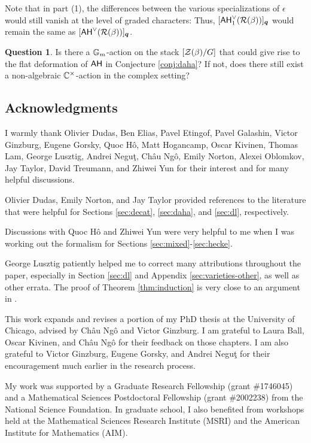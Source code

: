 \documentclass[a4paper,10pt,leqno]{amsart}
\theoremstyle{plain}
\theoremstyle{plain}
\theoremstyle{plain}
\theoremstyle{definition}
\newtheorem{quest}[mainthm]{Question}
\theoremstyle{remark}
\newcommand{\Q}{\bm{q}}
\begin{document}
Note that in part (1), the differences between the various specializations of $\epsilon$ would still vanish at the level of graded characters: 
Thus, $[\sf{AH}_1^\vee(\cal{R}(\beta))]_{\Q}$ would remain the same as $[\sf{AH}^\vee(\cal{R}(\beta))]_{\Q}$.

\begin{quest}
Is there a $\bb{G}_m$-action on the stack $[\cal{Z}(\beta)/G]$ that could give rise to the flat deformation of $\sf{AH}$ in Conjecture \ref{conj:daha}?
If not, does there still exist a non-algebraic $\bb{C}^\times$-action in the complex setting?
\end{quest}

\subsection{Acknowledgments}

I warmly thank Olivier Dudas, Ben Elias, Pavel Etingof, Pavel Galashin, Victor Ginzburg, Eugene Gorsky, Quoc H\^{o}, Matt Hogancamp, Oscar Kivinen, Thomas Lam, George Lusztig, Andrei Negu\c{t}, Ch\^{a}u Ng\^{o}, Emily Norton, Alexei Oblomkov, Jay Taylor, David Treumann, and Zhiwei Yun for their interest and for many helpful discussions.

Olivier Dudas, Emily Norton, and Jay Taylor provided references to the literature that were helpful for Sections \ref{sec:decat}, \ref{sec:daha}, and \ref{sec:dl}, respectively. 

Discussions with Quoc H\^{o} and Zhiwei Yun were very helpful to me when I was working out the formalism for Sections \ref{sec:mixed}-\ref{sec:hecke}.

George Lusztig patiently helped me to correct many attributions throughout the paper, especially in Section \ref{sec:dl} and Appendix \ref{sec:varieties-other}, as well as other errata.
The proof of Theorem \ref{thm:induction} is very close to an argument in \cite{ly_2019}.

This work expands and revises a portion of my PhD thesis at the University of Chicago, advised by Ch\^{a}u Ng\^{o} and Victor Ginzburg.
I am grateful to Laura Ball, Oscar Kivinen, and Ch\^{a}u Ng\^{o} for their feedback on those chapters.
I am also grateful to Victor Ginzburg, Eugene Gorsky, and Andrei Negu\c{t} for their encouragement much earlier in the research process.

My work was supported by a Graduate Research Fellowship (grant \#1746045) and a Mathematical Sciences Postdoctoral Fellowship (grant \#2002238) from the National Science Foundation.
In graduate school, I also benefited from workshops held at the Mathematical Sciences Research Institute (MSRI) and the American Institute for Mathematics (AIM).
\end{document}
